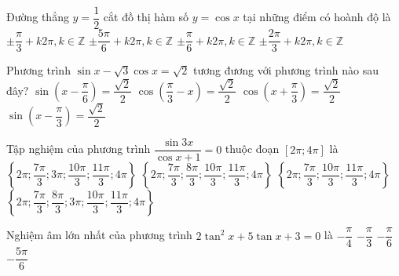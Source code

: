 \begin{ex}%
Đường thẳng $y=\dfrac{1}{2}$ cắt đồ thị hàm số $y=\cos x$ tại những điểm có hoành độ là
\choice
{\True $\pm \dfrac{\pi}{3}+k2\pi,k\in \mathbb{Z}$}
{$\pm \dfrac{5\pi}{6}+k2\pi,k\in \mathbb{Z}$}
{$\pm \dfrac{\pi}{6}+k2\pi,k\in \mathbb{Z}$}
{$\pm \dfrac{2\pi}{3}+k2\pi,k\in \mathbb{Z}$}
\end{ex}

\begin{ex}%
Phương trình $\sin x -\sqrt{3} \cos x =\sqrt{2}$ tương đương với phương trình nào sau đây?
\choice
{$\sin \left (x-\dfrac{\pi}{6}\right )=\dfrac{\sqrt{2}}{2}$}
{$\cos \left (\dfrac{\pi}{3}-x\right )=\dfrac{\sqrt{2}}{2}$}
{$\cos \left (x+\dfrac{\pi}{3}\right )=\dfrac{\sqrt{2}}{2}$}
{\True $\sin \left (x-\dfrac{\pi}{3}\right )=\dfrac{\sqrt{2}}{2}$}
\end{ex}

\begin{ex}%
Tập nghiệm của phương trình $\dfrac{\sin 3x}{\cos x+1}=0$ thuộc đoạn $[2\pi;4\pi]$ là
\choice
{$\left \{2\pi;\dfrac{7\pi}{3}; 3\pi;\dfrac{10\pi}{3};\dfrac{11\pi}{3};4\pi\right \}$}
{\True  $\left \{2\pi;\dfrac{7\pi}{3}; \dfrac{8\pi}{3};\dfrac{10\pi}{3};\dfrac{11\pi}{3};4\pi\right \}$}
{$\left \{2\pi;\dfrac{7\pi}{3};\dfrac{10\pi}{3};\dfrac{11\pi}{3};4\pi\right \}$}
{$\left \{2\pi;\dfrac{7\pi}{3}; \dfrac{8\pi}{3};3\pi;\dfrac{10\pi}{3};\dfrac{11\pi}{3};4\pi\right \}$}
\end{ex}

\begin{ex}%
Nghiệm âm lớn nhất của phương trình $2\tan^2x+5\tan x+3=0$ là
\choice
{\True $-\dfrac{\pi}{4}$}
{$-\dfrac{\pi}{3}$}
{$-\dfrac{\pi}{6}$}
{$-\dfrac{5\pi}{6}$}
\end{ex}

